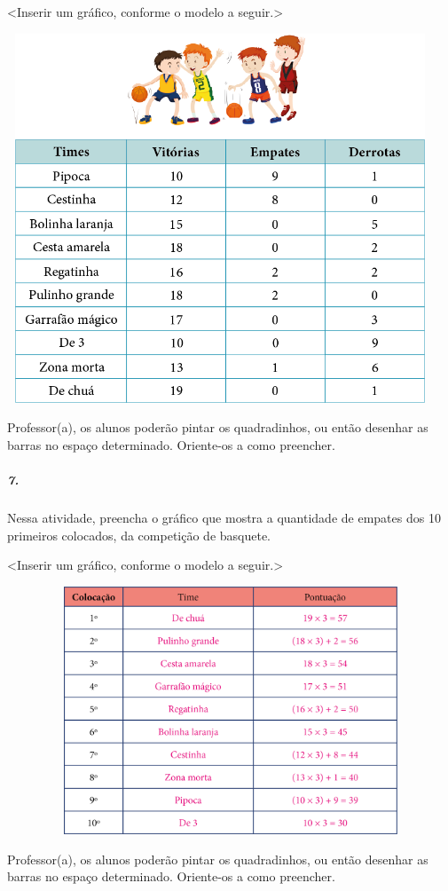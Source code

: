 \textless{}Inserir um gráfico, conforme o modelo a seguir.\textgreater{}

\includegraphics[width=5.00000in,height=4.33333in]{media/image94.png}

Professor(a), os alunos poderão pintar os quadradinhos, ou então
desenhar as barras no espaço determinado. Oriente-os a como preencher.

\subparagraph{7.}\label{section-84}

Nessa atividade, preencha o gráfico que mostra a quantidade de empates
dos 10 primeiros colocados, da competição de basquete.

\textless{}Inserir um gráfico, conforme o modelo a seguir.\textgreater{}

\includegraphics[width=6.20833in,height=2.91016in]{media/image95.png}

Professor(a), os alunos poderão pintar os quadradinhos, ou então
desenhar as barras no espaço determinado. Oriente-os a como preencher.

